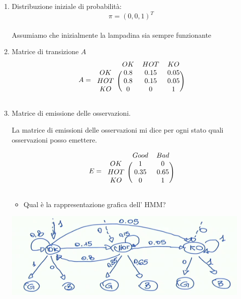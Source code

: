 \documentclass{article}
\begin{document}
\begin{enumerate}
	\item Distribuzione iniziale di probabilità: \[\pi = (0, 0, 1)^T \] \\
	     Assumiamo che inizialmente la lampadina sia sempre funzionante
	     
	\item Matrice di transizione $A$ 
	\[
	A = 
	\begin{blockarray}{cccccc}
		& OK & HOT & KO \\
		\begin{block}{c(ccccc)}
			OK &	0.8 &  0.15   & 0.05   \\
			HOT &	0.8 &  0.15   & 0.05 \\
			KO &	0   &  0      & 1   \\
		\end{block}
	\end{blockarray}
	\]	
	
	\item Matrice di emissione delle osservazioni.
	
	\begin{mdframed}[hidealllines=true,backgroundcolor=blue!20]
		La matrice di emissioni delle osservazioni mi dice per ogni stato quali osservazioni posso emettere.
	\end{mdframed} 
		\[
	E = 
	\begin{blockarray}{cccccc}
		& Good & Bad \\
		\begin{block}{c(ccccc)}
			OK  &	1    &  0   \\
			HOT &	0.35 &  0.65   \\
			KO  &	0    &  1      \\
		\end{block}
	\end{blockarray}
	\]	

\pagebreak

\begin{itemize}
 \item  Qual è la rappresentazione grafica dell' HMM?
\end{itemize}
	\begin{center}
		\includegraphics[width=12cm]{./immagini/hmm_es1.png}
	\end{center}
	
\end{enumerate}
\end{document}
